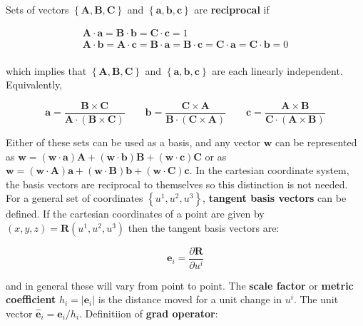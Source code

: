 \documentclass[12pt]{article}
\begin{document}
Sets of vectors $\left\{\mathbf{A, B, C}\right\}$ and $\left\{\mathbf{a, b, c}\right\}$ are {\bf reciprocal} if

\begin{eqnarray}
\mathbf{A\cdot a} = \mathbf{B\cdot b} = \mathbf{C\cdot c} = 1\\
\mathbf{A\cdot b} = \mathbf{A\cdot c} = \mathbf{B\cdot a} = \mathbf{B\cdot c} = \mathbf{C\cdot a} = \mathbf{C\cdot b} = 0 \\
\end{eqnarray}

which implies that $\left\{\mathbf{A, B, C}\right\}$ and $\left\{\mathbf{a, b, c}\right\}$ are each linearly independent.
Equivalently,

\begin{equation}
\mathbf{a} = \frac{\mathbf{B\times C}}{\mathbf{A\cdot\left(B\times C\right)}}\qquad
\mathbf{b} = \frac{\mathbf{C\times A}}{\mathbf{B\cdot\left(C\times A\right)}}\qquad
\mathbf{c} = \frac{\mathbf{A\times B}}{\mathbf{C\cdot\left(A\times B\right)}}
\end{equation}

Either of these sets can be used as a basis, and any vector $\mathbf{w}$ can be represented as
$\mathbf{w} = \left(\mathbf{w\cdot a}\right)\mathbf{A} + \left(\mathbf{w\cdot b}\right)\mathbf{B} +
\left(\mathbf{w\cdot c}\right)\mathbf{C}$ or as $\mathbf{w} = \left(\mathbf{w\cdot A}\right)\mathbf{a} +
\left(\mathbf{w\cdot B}\right)\mathbf{b} + \left(\mathbf{w\cdot C}\right)\mathbf{c}$. In the cartesian
coordinate system, the basis vectors are reciprocal to themselves so this distinction is not needed.
For a general set of coordinates $\left\{u^1, u^2, u^3\right\}$, {\bf tangent basis vectors} can be defined. If
the cartesian coordinates of a point are given by $\left(x, y, z\right) = \mathbf{R}\left(u^1, u^2, u^3\right)$
then the tangent basis vectors are:

\begin{equation}
\mathbf{e}_i = \frac{\partial\mathbf{R}}{\partial u^i}
\end{equation}

\noindent and in general these will vary from point to point. The {\bf scale factor} or {\bf metric coefficient}
$h_i =\left|\mathbf{e}_i\right| $ is the distance moved for a unit change in $u^i$. The unit vector
$\mathbf{\hat{e}}_i = \mathbf{e}_i/h_i$. Definitiion of {\bf grad operator}:

\begin{center}
\end{center}
\end{document}
